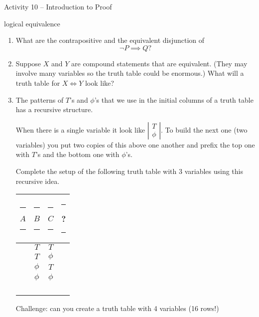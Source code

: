 \documentclass{amsart}
\begin{document}
\thispagestyle{empty}

\centerline{\Large Activity 10 -- Introduction to Proof}
\centerline{\large logical equivalence}

\bigskip
\Large


\begin{enumerate}

\item What are the contrapositive and the equivalent disjunction of 
\[ \lnot P \implies Q? \] 

\vfill

\item Suppose $X$ and $Y$ are compound statements that are equivalent. (They may involve many variables so the truth table could be enormous.)  What will a truth table for $X \iff Y$ look like?


\vfill

\item The patterns of $T$'s and $\phi$'s that we use in the initial columns of a truth table has a recursive structure.

When there is a single variable it look like $\left| \begin{array}{c} T \\ \phi \end{array} \right|$.  To build the next one (two variables) you put two copies of this above one another and prefix the top one with $T$'s and the bottom one with $\phi$'s.

Complete the setup of the following truth table with 3 variables using this recursive idea.

\begin{tabular}{c|cc||c}
\rule{4pt}{0pt} $A$ \rule{4pt}{0pt} & \rule{4pt}{0pt} $B$ \rule{4pt}{0pt} & \rule{4pt}{0pt} $C$ \rule{4pt}{0pt} & \rule{18pt}{0pt} ? \rule{18pt}{0pt} \\ \hline
 & $T$ & $T$ & \\
 & $T$ & $\phi$ & \\
 & $\phi$ & $T$ & \\
 & $\phi$ & $\phi$ & \\ \hline
 & & & \\
 & & & \\
 & & & \\
 & & & \\
\end{tabular}

\vfill

Challenge: can you create a truth table with 4 variables (16 rows!)


\end{enumerate}
\end{document}
